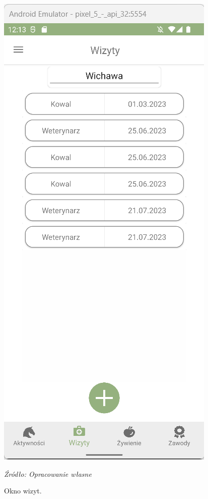 \documentclass[12pt,oneside]{report}
\begin{document}
\begin{figure}[H]
	\begin{center}
	\begin{minipage}{5cm}
		\centering
		\includegraphics[scale=0.6]{VisitView}
		\caption{\centering Okno wizyt.}
		\textit{Źródło: Opracowanie własne}
		\label{VisitView}
	\end{minipage}
	\hfil
	\begin{minipage}{5cm}
		\centering

\end{minipage}
\end{center}
\end{figure}
\end{document}
